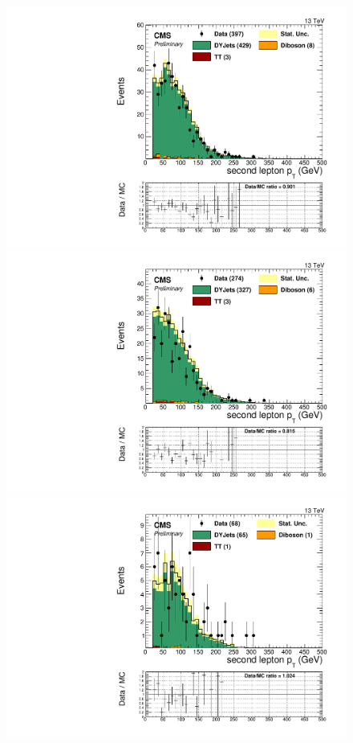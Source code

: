 \begin{figure}[h]
\begin{center}
\includegraphics[scale=0.37]{figures/control/ptlep2MLP.pdf}
\includegraphics[scale=0.37]{figures/control/ptlep2ELP.pdf}\\[2cm]
\includegraphics[scale=0.37]{figures/control/ptlep2MHP.pdf}

\end{center}
\end{figure}
